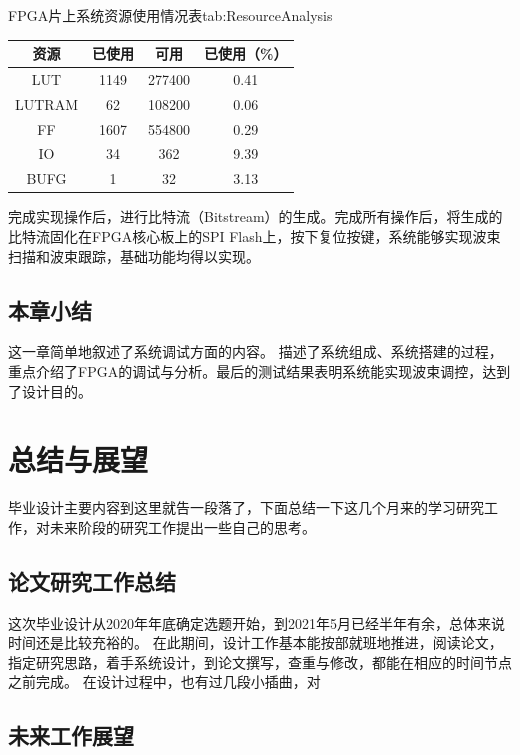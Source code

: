 \documentclass[supercite]{HustGraduPaper}
\begin{document}
\begin{generaltab}{FPGA片上系统资源使用情况表}{tab:ResourceAnalysis}
	\begin{tabular}{cccc}
		\toprule
		资源     & 已使用       & 可用      & 已使用（\%）    \\ \midrule
		LUT      & 1149        & 277400    & 0.41           \\
		LUTRAM   & 62          & 108200    & 0.06           \\
		FF       & 1607        & 554800    & 0.29           \\
		IO       & 34          & 362       & 9.39           \\
		BUFG     & 1           & 32        & 3.13           \\
		\bottomrule
	\end{tabular}
\end{generaltab}

完成实现操作后，进行比特流（Bitstream）的生成。完成所有操作后，将生成的比特流固化在FPGA核心板上的SPI Flash上，按下复位按键，系统能够实现波束扫描和波束跟踪，基础功能均得以实现。

\subsection{本章小结}

这一章简单地叙述了系统调试方面的内容。
描述了系统组成、系统搭建的过程，重点介绍了FPGA的调试与分析。最后的测试结果表明系统能实现波束调控，达到了设计目的。

\section{总结与展望}\label{sec:conclusion}

毕业设计主要内容到这里就告一段落了，下面总结一下这几个月来的学习研究工作，对未来阶段的研究工作提出一些自己的思考。

\subsection{论文研究工作总结}

这次毕业设计从2020年年底确定选题开始，到2021年5月已经半年有余，总体来说时间还是比较充裕的。
在此期间，设计工作基本能按部就班地推进，阅读论文，指定研究思路，着手系统设计，到论文撰写，查重与修改，都能在相应的时间节点之前完成。
在设计过程中，也有过几段小插曲，对

\subsection{未来工作展望}
\end{document}
